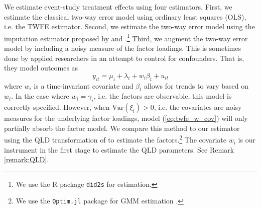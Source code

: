 \documentclass[12pt]{article}
\begin{document}
We estimate event-study treatment effects using four estimators. First, we estimate the classical two-way error model using ordinary least squares (OLS), i.e. the TWFE estimator. Second, we estimate the two-way error model using the imputation estimator proposed by \citet{Borusyak_Jaravel_Spiess_2021} and \citet{Gardner_2021}.\footnote{We use the R package \texttt{did2s} \citep{butts2022did2s} for estimation.} Third, we augment the two-way error model by including a noisy measure of the factor loadings. This is sometimes done by applied researchers in an attempt to control for confounders. That is, they model outcomes as 
\begin{equation}\label{eq:twfe_w_cov}
  y_{it} = \mu_i + \lambda_t + w_i \beta_t + u_{it}
\end{equation}
where $w_i$ is a time-invariant covariate and $\beta_t$ allows for trends to vary based on $w_i$. In the case where $w_i = \gamma_i$, i.e. the factors are observable, this model is correctly specified. However, when $\text{Var}(\xi_i) > 0$, i.e. the covariates are noisy measures for the underlying factor loadings, model (\ref{eq:twfe_w_cov}) will only partially absorb the factor model. We compare this method to our estimator using the QLD transformation of \citet{Ahn_Lee_Schmidt_2013} to estimate the factors.\footnote{We use the \texttt{Optim.jl} package for GMM estimation \citep{mogensen2018optim}.} The covariate $w_i$ is our instrument in the first stage to estimate the QLD parameters. See Remark \ref{remark:QLD}.
\end{document}
